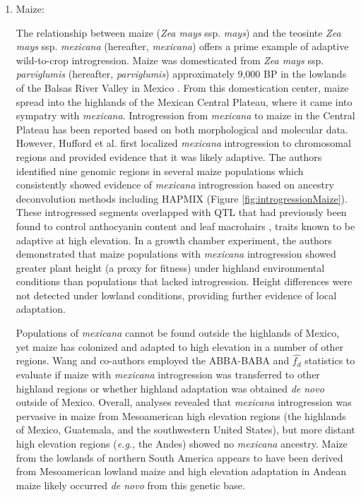\documentclass[11pt]{article}
\begin{document}
\begin{enumerate}
\item{Maize:}

The relationship between maize (\emph{Zea mays} ssp. \emph{mays}) and the teosinte \emph{Zea mays} ssp. \emph{mexicana} (hereafter, \emph{mexicana}) offers a prime example of adaptive wild-to-crop introgression.
Maize was domesticated from \emph{Zea mays} ssp. \emph{parviglumis} (hereafter, \emph{parviglumis})  approximately 9,000 BP in the lowlands of the Balsas River Valley in Mexico \cite{matsuoka2002single}.
From this domestication center, maize spread into the highlands of the Mexican Central Plateau, where it came into sympatry with \emph{mexicana}.
Introgression from \emph{mexicana} to maize in the Central Plateau has been reported based on both morphological \cite {wilkes1977} and molecular \cite{vanHeerwaarden2011, doebley1987} data.
However, Hufford et al. \cite{Hufford2013} first localized \emph{mexicana} introgression to chromosomal regions and provided evidence that it was likely adaptive.
The authors identified nine genomic regions in several maize populations which consistently showed evidence of \emph{mexicana} introgression based on ancestry deconvolution methods including HAPMIX (Figure \ref{fig:introgressionMaize}).
These introgressed segments overlapped with QTL that had previously been found to control anthocyanin content and leaf macrohairs \cite{lauter2004}, traits known to be adaptive at high elevation.
In a growth chamber experiment, the authors demonstrated that maize populations with \emph{mexicana} introgression showed greater plant height (a proxy for fitness) under highland environmental conditions than populations that lacked introgression.
Height differences were not detected under lowland conditions, providing further evidence of local adaptation.


Populations of \emph{mexicana} cannot be found outside the highlands of Mexico, yet maize has colonized and adapted to high elevation in a number of other regions.
Wang and co-authors \cite{Wang2017} employed the ABBA-BABA and $\hat{f_{d}}$ statistics to evaluate if maize with \emph{mexicana} introgression was transferred to other highland regions or whether highland adaptation was obtained \emph{de novo} outside of Mexico.
Overall, analyses revealed that  \emph{mexicana} introgression was pervasive in maize from Mesoamerican high elevation regions (the highlands of Mexico, Guatemala, and the southwestern United States), but more distant high elevation regions (\emph{e.g.,} the Andes) showed no \emph{mexicana} ancestry.
Maize from the lowlands of northern South America appears to have been derived from Mesoamerican lowland maize and high elevation adaptation in Andean maize likely occurred \emph{de novo} from this genetic base.



\end{enumerate}
\end{document}
